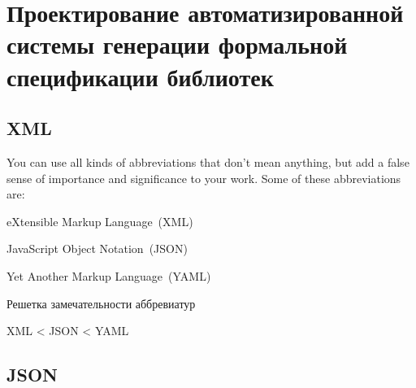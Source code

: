 \chapter{Проектирование автоматизированной системы генерации формальной спецификации библиотек}


\section{XML}

\blindtext

You can use all kinds of abbreviations that don't mean anything, but add
a false sense of importance and significance to your work. Some of these
abbreviations are:
%
\begin{itemize*}
\item eXtensible Markup Language~(XML)
\item JavaScript Object Notation~(JSON)
\item Yet Another Markup Language~(YAML)
\end{itemize*}
%

\begin{table}
\captionsetup{skip=5pt}
\caption{Решетка замечательности аббревиатур}
\centering
XML < JSON < YAML
\end{table}

\Blindtext

\section{JSON}

\Blindtext
